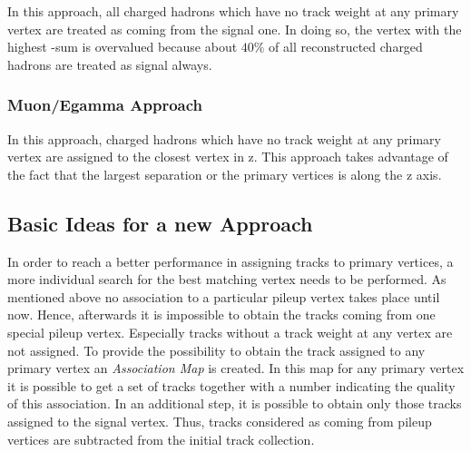 In this approach, all charged hadrons which have no track weight at any primary vertex are treated as coming from the signal one. In doing so, the vertex with the highest \pt-sum is overvalued because about $40\%$ of all reconstructed charged hadrons are treated as signal always.

\subsubsection{Muon/Egamma Approach \label{sec:IntroME}}

In this approach, charged hadrons which have no track weight at any primary vertex are assigned to the closest vertex in z. This approach takes advantage of the fact that the largest separation or the primary vertices is along the z axis. 

\subsection{Basic Ideas for a new Approach}

In order to reach a better performance in assigning tracks to primary vertices, a more individual search for the best matching vertex needs to be performed. As mentioned above no association to a particular pileup vertex takes place until now. Hence, afterwards it is impossible to obtain the tracks coming from one special pileup vertex. Especially tracks without a track weight at any vertex are not assigned. To provide the possibility to obtain the track assigned to any primary vertex an \textit{Association Map} is created. In this map for any primary vertex it is possible to get a set of tracks together with a number indicating the quality of this association. In an additional step, it is possible to obtain only those tracks assigned to the signal vertex. Thus, tracks considered as coming from pileup vertices are subtracted from the initial track collection.

